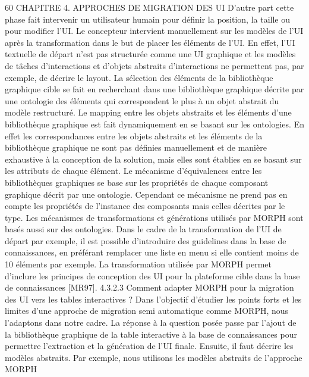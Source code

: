 \documentclass{article}
\begin{document}
60
CHAPITRE 4. APPROCHES DE MIGRATION DES UI
D’autre part cette phase fait intervenir un utilisateur humain pour d\'{e}ﬁnir la position, la taille ou
pour modiﬁer l’UI. Le concepteur intervient manuellement sur les mod\`{e}les de l’UI apr\`{e}s la transformation dans le but de placer les \'{e}l\'{e}ments de l’UI. En effet, l’UI textuelle de d\'{e}part n’est pas structur\'{e}e
comme une UI graphique et les mod\`{e}les de t\^{a}ches d’interactions et d’objets abstraits d’interactions ne
permettent pas, par exemple, de d\'{e}crire le layout.
La s\'{e}lection des \'{e}l\'{e}ments de la biblioth\`{e}que graphique cible se fait en recherchant dans une biblioth\`{e}que graphique d\'{e}crite par une ontologie des \'{e}l\'{e}ments qui correspondent le plus \`{a} un objet abstrait
du mod\`{e}le restructur\'{e}.
Le mapping entre les objets abstraits et les \'{e}l\'{e}ments d’une biblioth\`{e}que graphique est fait dynamiquement en se basant sur les ontologies. En effet les correspondances entre les objets abstraits et
les \'{e}l\'{e}ments de la biblioth\`{e}que graphique ne sont pas d\'{e}ﬁnies manuellement et de mani\`{e}re exhaustive
\`{a} la conception de la solution, mais elles sont \'{e}tablies en se basant sur les attributs de chaque \'{e}l\'{e}ment.
Le m\'{e}canisme d’\'{e}quivalences entre les biblioth\`{e}ques graphiques se base sur les propri\'{e}t\'{e}s de chaque
composant graphique d\'{e}crit par une ontologie. Cependant ce m\'{e}canisme ne prend pas en compte les
propri\'{e}t\'{e}s de l’instance des composants mais celles d\'{e}crites par le type.
Les m\'{e}canismes de transformations et g\'{e}n\'{e}rations utilis\'{e}s par MORPH sont bas\'{e}s aussi sur des
ontologies. Dans le cadre de la transformation de l’UI de d\'{e}part par exemple, il est possible d’introduire des guidelines dans la base de connaissances, en pr\'{e}f\'{e}rant remplacer une liste en menu si elle
contient moins de 10 \'{e}l\'{e}ments par exemple.
La transformation utilis\'{e}e par MORPH permet d’inclure les principes de conception des UI pour
la plateforme cible dans la base de connaissances [MR97].
4.3.2.3
Comment adapter MORPH pour la migration des UI vers les tables interactives ?
Dans l’objectif d’\'{e}tudier les points forts et les limites d’une approche de migration semi automatique comme MORPH, nous l’adaptons dans notre cadre.
La r\'{e}ponse \`{a} la question pos\'{e}e passe par l’ajout de la biblioth\`{e}que graphique de la table interactive
\`{a} la base de connaissances pour permettre l’extraction et la g\'{e}n\'{e}ration de l’UI ﬁnale. Ensuite, il faut
d\'{e}crire les mod\`{e}les abstraits. Par exemple, nous utilisons les mod\`{e}les abstraits de l’approche MORPH
\end{document}

